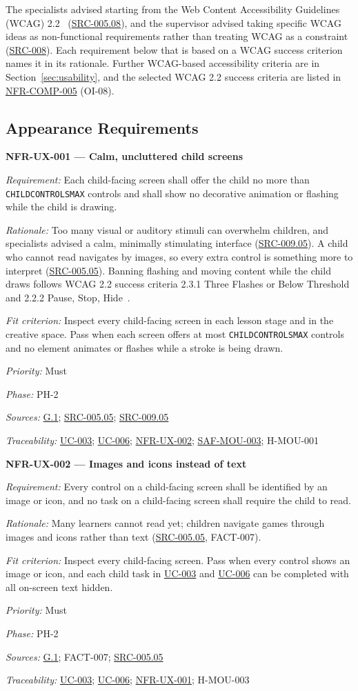 \documentclass[12pt]{article}
\renewcommand{\_}{\textunderscore\allowbreak}%
\newcommand{\goalref}[1]{\hyperref[goal:#1]{G.#1}}
\newcommand{\ucref}[1]{\hyperref[uc:#1]{\mbox{UC-#1}}}
\newenvironment{srsrequirement}[2]{%
  \par\medskip\noindent\phantomsection\label{req:#1}%
  \textbf{#1 --- #2}\par\nobreak\smallskip }{\par\medskip}
\newcommand{\reqfield}[2]{\noindent\textit{#1:} #2\par}
\newcommand{\reqshall}[1]{\reqfield{Requirement}{#1}}
\newcommand{\reqrationale}[1]{\reqfield{Rationale}{#1}}
\newcommand{\reqfit}[1]{\reqfield{Fit criterion}{#1}}
\newcommand{\reqpriority}[1]{\reqfield{Priority}{#1}}
\newcommand{\reqphase}[1]{\reqfield{Phase}{#1}}
\newcommand{\reqsources}[1]{\reqfield{Sources}{#1}}
\newcommand{\reqtraces}[1]{\reqfield{Traceability}{#1}}
\newcommand{\reqref}[1]{\hyperref[req:#1]{#1}}
\newcommand{\srcref}[1]{\hyperref[src:#1]{SRC-#1}}
\providecommand{\ucref}[1]{\hyperref[uc:#1]{UC-#1}}
\begin{document}
The specialists advised starting from the Web Content Accessibility Guidelines
(WCAG) 2.2~\cite{wcag22} (\srcref{005.08}), and the supervisor advised taking
specific WCAG ideas as non-functional requirements rather than treating WCAG as
a constraint (\srcref{008}). Each requirement below that is based on a WCAG
success criterion names it in its rationale. Further WCAG-based accessibility
criteria are in Section~\ref{sec:usability}, and the selected WCAG 2.2 success
criteria are listed in \reqref{NFR-COMP-005} (OI-08).

\subsection{Appearance Requirements}
\label{sec:appearance}

\begin{srsrequirement}{NFR-UX-001}{Calm, uncluttered child screens}
  \reqshall{Each child-facing screen shall offer the child no more than
\texttt{CHILD\_CONTROLS\_MAX} controls and shall show no decorative animation or
flashing while the child is drawing.} \reqrationale{Too many visual or auditory
stimuli can overwhelm children, and specialists advised a calm, minimally
stimulating interface (\srcref{009.05}). A child who cannot read navigates by
images, so every extra control is something more to interpret (\srcref{005.05}).
Banning flashing and moving content while the child draws follows WCAG 2.2
success criteria 2.3.1 Three Flashes or Below Threshold and 2.2.2 Pause, Stop,
Hide~\cite{wcag22}.} \reqfit{Inspect every child-facing screen in each lesson
stage and in the creative space. Pass when each screen offers at most
\texttt{CHILD\_CONTROLS\_MAX} controls and no element animates or flashes while
a stroke is being drawn.}
  \reqpriority{Must}
  \reqphase{PH-2}
  \reqsources{\goalref{1}; \srcref{005.05}; \srcref{009.05}}
  \reqtraces{\ucref{003}; \ucref{006}; \reqref{NFR-UX-002};
  \reqref{SAF-MOU-003}; H-MOU-001}
\end{srsrequirement}

\begin{srsrequirement}{NFR-UX-002}{Images and icons instead of text}
  \reqshall{Every control on a child-facing screen shall be identified by an
image or icon, and no task on a child-facing screen shall require the child to
read.} \reqrationale{Many learners cannot read yet; children navigate games
through images and icons rather than text (\srcref{005.05}, FACT-007).}
\reqfit{Inspect every child-facing screen. Pass when every control shows an
image or icon, and each child task in \ucref{003} and \ucref{006} can be
completed with all on-screen text hidden.}
  \reqpriority{Must}
  \reqphase{PH-2}
  \reqsources{\goalref{1}; FACT-007; \srcref{005.05}} \reqtraces{\ucref{003};
  \ucref{006}; \reqref{NFR-UX-001}; H-MOU-003}
\end{srsrequirement}
\end{document}
